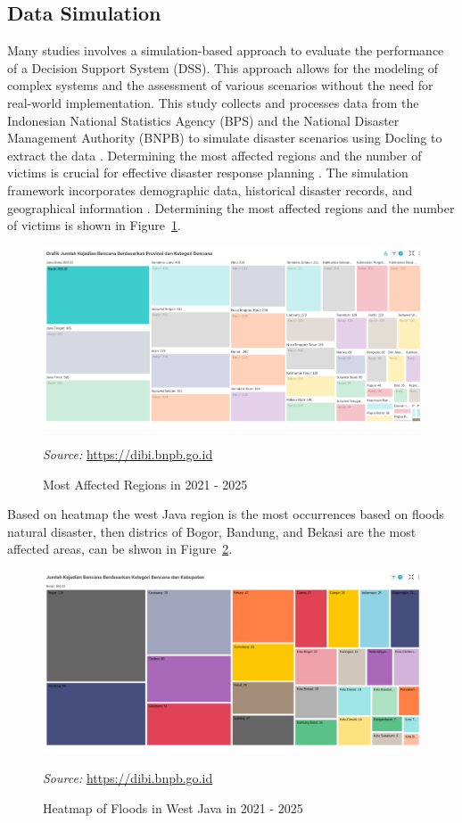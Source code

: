 \documentclass[journal,final,a4paper,twoside,11pt]{IEEEtran}
\begin{document}
\subsection{Data Simulation}

Many studies involves a simulation-based approach to evaluate the performance of a Decision Support System (DSS)\cite{he2020dynamic}. This approach allows for the modeling of complex systems and the assessment of various scenarios without the need for real-world implementation\cite{latchmore2023integrating}. This study collects and processes data from the Indonesian National Statistics Agency (BPS) and the National Disaster Management Authority (BNPB) to simulate disaster scenarios using Docling to extract the data \cite{Docling}. Determining the most affected regions and the number of victims is crucial for effective disaster response planning \cite{endo2020estimating}. The simulation framework incorporates demographic data, historical disaster records, and geographical information \cite{santos2020workforce}. Determining the most affected regions and the number of victims is shown in Figure~\ref{fig:simulationframework}. 
\begin{figure}[htbp]
    \centerline{\includegraphics[width=0.8\linewidth]{fig4.png}
    }
    \caption{Most Affected Regions in 2021 - 2025}
    \label{fig:simulationframework}
    \footnotesize{\textit{Source:} \url{https://dibi.bnpb.go.id}}
\end{figure}

Based on heatmap the west Java region is the most occurrences based on floods natural disaster, then districs of Bogor, Bandung, and Bekasi are the most affected areas, can be shwon in Figure~\ref{fig:heatmap2}. 
\begin{figure}[htbp]
    \centerline{\includegraphics[width=0.8\linewidth]{fig5.png}}
    \caption{Heatmap of Floods in West Java in 2021 - 2025}
    \label{fig:heatmap2}
    \footnotesize{\textit{Source:} \url{https://dibi.bnpb.go.id}}
\end{figure} 
\end{document}
